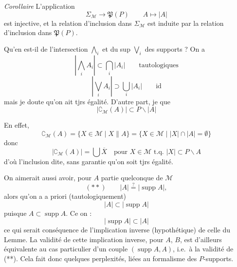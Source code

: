 \documentclass[11pt,a4paper]{article}
\begin{document}
\emph{Corollaire} \quad L'application
\[
  \Sigma_{\mathcal{M}} \longrightarrow \mathfrak{P}(P) \qquad A \longmapsto |A|
\]
est injective, et la relation d'inclusion dans $\Sigma_{\mathcal{M}}$ est induite par la relation d'inclusion dans $\mathfrak{P}(P)$.

Qu'en est-il  de l'intersection $\bigwedge_i$  et du  sup $\bigvee_i$ des supports ? On a
\[
  \left| \bigwedge_i A_i \right| \subset \bigcap_i |A_i| \qquad \text{tautologiques}
\]
\[
  \left| \bigvee_i A_i \right| \supset \bigcup_i |A_i| \qquad \text{id}
\]
mais je doute qu'on ait tjrs égalité. D'autre part, je  que
\[
  |\complement_{\mathcal{M}}(A)| \subset P \smallsetminus |A|
\]

En effet,
\[
  \complement_{\mathcal{M}}(A) = \lbrace X \in \mathcal{M} \mid X \parallel A \rbrace = \lbrace X \in \mathcal{M} \mid |X| \cap |A| = \emptyset \rbrace
\]
donc
\[
  |\complement_{\mathcal{M}}(A)| = \bigcup \overline{X} \quad \text{pour } X \in \mathcal{M} \text{ t.q.\ } |X| \subset P \smallsetminus A
\]
d'où l'inclusion dite, sans garantie qu'on soit tjrs égalité.

On aimerait aussi avoir, pour $A$ partie quelconque de $\mathcal{M}$
\[
  (**) \qquad |A| \overset{?}{=} |\operatorname{supp} A| ,
\]
alors qu'on a a priori (tautologiquement)
\[
  |A| \subset |\operatorname{supp} A|
\]
puisque $A \subset \operatorname{supp} A$. Ce  on   :
\[
  |\operatorname{supp} A| \subset |A|
\]
ce qui serait conséquence de l'implication inverse (hypothétique) de celle du Lemme. La validité de cette implication inverse, pour \struck{\ill{}} $A$, $B$, est d'ailleurs équivalente au cas particulier d'un couple $(\operatorname{supp} A, A)$, i.e.\ à la validité de (**). Cela fait donc quelques perplexités, liées au formalisme \struck{\ill{}} des $P$-supports.
\end{document}
